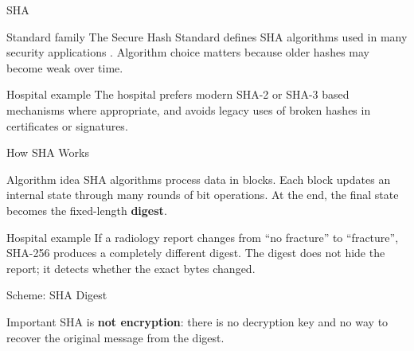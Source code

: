 \documentclass[presentation]{beamer}
\begin{document}
\begin{frame}[c]{SHA}
\begin{block}{Standard family}
The Secure Hash Standard defines SHA algorithms used in many security applications
\cite{nist_fips_180_4}. Algorithm choice matters because older hashes may become weak over time.
\end{block}

\begin{exampleblock}{Hospital example}
The hospital prefers modern SHA-2 or SHA-3 based mechanisms where appropriate, and avoids legacy
uses of broken hashes in certificates or signatures.
\end{exampleblock}
\end{frame}

\begin{frame}[c]{How SHA Works}
\begin{block}{Algorithm idea}
SHA algorithms process data in blocks. Each block updates an internal state through many rounds of
bit operations. At the end, the final state becomes the fixed-length \textbf{digest}.
\end{block}

\begin{exampleblock}{Hospital example}
If a radiology report changes from ``no fracture'' to ``fracture'', SHA-256 produces a completely
different digest. The digest does not hide the report; it detects whether the exact bytes changed.
\end{exampleblock}
\end{frame}

\begin{frame}[c]{Scheme: SHA Digest}
\begin{center}
\end{center}

\begin{block}{Important}
SHA is \textbf{not encryption}: there is no decryption key and no way to recover the original
message from the digest.
\end{block}
\end{frame}
\end{document}

